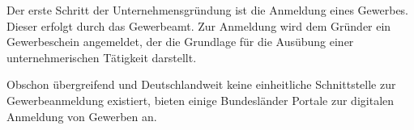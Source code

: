 
Der erste Schritt der Unternehmensgründung ist die Anmeldung eines Gewerbes. Dieser erfolgt
durch das Gewerbeamt. Zur Anmeldung wird dem Gründer ein Gewerbeschein angemeldet, der die Grundlage
für die Ausübung einer unternehmerischen Tätigkeit darstellt.

Obschon übergreifend und Deutschlandweit keine einheitliche Schnittstelle zur Gewerbeanmeldung existiert, 
bieten einige Bundesländer Portale zur digitalen Anmeldung von Gewerben an. 







